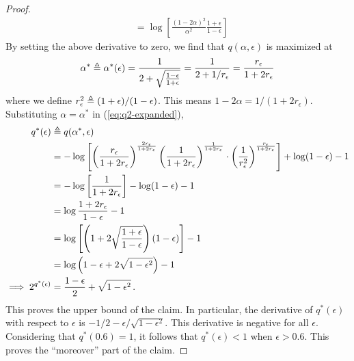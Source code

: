\begin{proof}
\begin{align*}
&= \log\left[ \frac{(1-2\alpha)^2}{\alpha^2} \frac{1+\epsilon}{1-\epsilon} \right]
\end{align*}
By setting the above derivative to zero, we find that $q(\alpha, \epsilon)$ is maximized at 
\[
\alpha^* \triangleq \alpha^*(\epsilon) 
= \frac{1}{2+\sqrt{\frac{1-\epsilon}{1+\epsilon}} }
= \frac{1}{2+1/r_\epsilon }
= \frac{r_\epsilon}{1 + 2 r_\epsilon }
\]
where we define $r_\epsilon^2 \triangleq (1+\epsilon)/(1-\epsilon)$. This means $1-2\alpha = 1/(1+2 r_\epsilon)$. Substituting $\alpha = \alpha^*$ in (\ref{eq:q2-expanded}),
\begin{align*} 
q^*(\epsilon) 
&\triangleq q(\alpha^*, \epsilon) \\
&= - \log\left[
\left(\frac{r_\epsilon}{1 + 2 r_\epsilon }\right)^\frac{2 r_\epsilon}{1+2 r_\epsilon}
\left(\frac{1}{1+2r_\epsilon}\right)^\frac{1}{1+2 r_\epsilon}
\cdot \left(\frac{1}{r_\epsilon^2}\right)^\frac{r_\epsilon}{1+2 r_\epsilon}
\right] + \log (1-\epsilon) - 1 \nonumber \\
&= - \log\left[
\frac{1}{1+2 r_\epsilon}
\right] - \log (1-\epsilon) - 1 \nonumber \\
&= \log\frac{1 + 2 r_\epsilon}{1-\epsilon} - 1 \nonumber \\
&= \log\left[\left(1 + 2 \sqrt{\frac{1+\epsilon}{1-\epsilon} } \right) (1-\epsilon) \right] - 1 \nonumber \\
&= \log\left( 1-\epsilon + 2\sqrt{1-\epsilon^2}\right) - 1 \nonumber \\
\implies 2^{q^*(\epsilon)}
&= \frac{1-\epsilon}{2} + \sqrt{1-\epsilon^2}\, .
\end{align*}
This proves the upper bound of the claim. In particular, the derivative of $q^*(\epsilon)$ with respect to $\epsilon$ is $-1/2 - \epsilon/\sqrt{1-\epsilon^2}$. This derivative is negative for all $\epsilon$. Considering that $q^*(0.6) = 1$, it follows that $q^*(\epsilon) < 1$ when $\epsilon > 0.6$. This proves the ``moreover'' part of the claim.


\end{proof}
